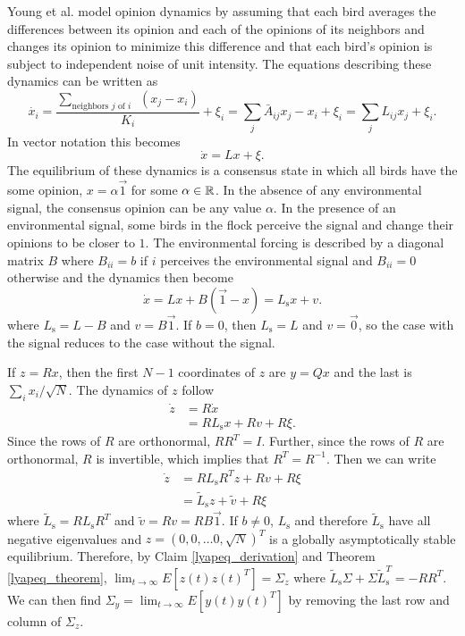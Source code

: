\documentclass{article}
\begin{document}
Young et al. \cite{Young:2010fk} model opinion dynamics by assuming that each bird averages the differences between its opinion and each of the opinions of its neighbors and changes its opinion to minimize this difference and that each bird's opinion is subject to independent noise of unit intensity. The equations describing these dynamics can be written as 
\begin{equation}
\dot{x_i}=\frac{\sum_{\text{neighbors $j$ of $i$ } }(x_j-x_i)}{K_i} +\xi_i=\sum_j\bar{A}_{ij}x_j-x_i+\xi_i=\sum_jL_{ij}x_j+\xi_i.
\end{equation}
In vector notation this becomes
\begin{equation}
\dot{x}=Lx+\xi.
\end{equation}
The equilibrium of these dynamics is a consensus state in which all birds have the some opinion, $x=\alpha\vec{1}$ for some $\alpha\in{\mathbb{R}}$. In the absence of any environmental signal, the consensus opinion can be any value $\alpha$. In the presence of an environmental signal, some birds in the flock perceive the signal and change their opinions to be closer to $1$. The environmental forcing is described by a diagonal matrix $B$ where $B_{ii}=b$ if $i$ perceives the environmental signal and $B_{ii}=0$ otherwise and the dynamics then become
\begin{equation}
\dot{x}=Lx+B(\vec{1}-x)=L_\text{s}x+v.
\end{equation}
where $L_\text{s}=L-B$ and $v=B\vec{1}$. If $b=0$, then $L_\text{s}=L$ and $v=\vec{0}$, so the case with the signal reduces to the case without the signal. 


If $z=Rx$, then the first $N-1$ coordinates of $z$ are $y=Qx$ and the last is $\sum_ix_i/\sqrt{N}$. The dynamics of $z$ follow
\begin{align*}
\dot{z}&=R\dot{x}
\\&=RL_\text{s}x+Rv+R\xi.
\end{align*}
Since the rows of $R$ are orthonormal, $RR^T=I$. Further, since the rows of $R$ are orthonormal, $R$ is invertible, which implies that $R^T=R^{-1}$.  Then we can write
\begin{align*}
\dot{z}&=RL_\text{s}R^Tz+Rv+R\xi
\\&=\tilde{L}_\text{s}z+\tilde{v}+R\xi 
\end{align*}
where $\tilde{L}_\text{s}=RL_\text{s}R^T$ and $\tilde{v}=Rv=RB\vec{1}$. If $b\neq 0$, $L_\text{s}$ and therefore $\tilde{L}_\text{s}$ have all negative eigenvalues and $z=(0, 0, \dots 0, \sqrt{N})^T$ is a globally asymptotically stable equilibrium. Therefore, by Claim \ref{lyapeq_derivation} and Theorem \ref{lyapeq_theorem}, $\lim_{t\to\infty}E[z(t)z(t)^T]=\Sigma_z$ where $\tilde{L}_\text{s}\Sigma+\Sigma\tilde{L}_\text{s}^T=-RR^T$. We can then find $\Sigma_y=\lim_{t\to\infty}E[y(t)y(t)^T]$
by removing the last row and column of $\Sigma_z$.
\end{document}
